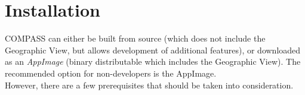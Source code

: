 \chapter{Installation}
\label{sec:installation}

COMPASS can either be built from source (which does not include the Geographic View, but allows development of additional features), or downloaded as an \textit{AppImage} (binary distributable which includes the Geographic View). The recommended option for non-developers is the AppImage. \\

However, there are a few prerequisites that should be taken into consideration.












